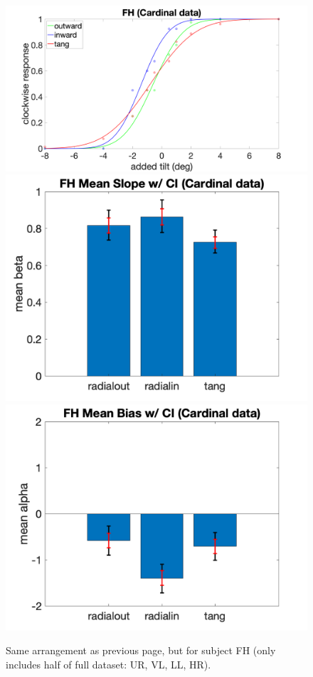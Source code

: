 \documentclass[11pt]{article} %
\begin{document}
\begin{figure}[H]
\includegraphics[scale=.06]{Images/PF_FH_cardinal.png}
\includegraphics[scale=.11]{Images/MeanSlopeError_ci_FH_cardinal.png}
\includegraphics[scale=.11]{Images/MeanBiasError_ci_FH_cardinal.png}
\caption{Same arrangement as previous page, but for subject FH (only includes half of full dataset: UR, VL, LL, HR).}
\end{figure}
\end{document}
